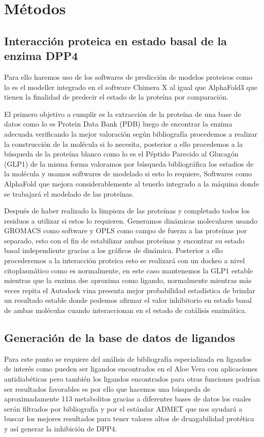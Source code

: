 \section{Métodos}

\subsection{Interacción proteica en estado basal de la enzima DPP4}
Para ello haremos uso de los softwares de predicción de modelos proteicos como lo es el modeller integrado en el software Chimera X al igual que AlphaFold3 que tienen la finalidad de predecir el estado de la proteína por comparación.

El primero objetivo a cumplir es la extracción de la proteína de una base de datos como lo es Protein Data Bank (PDB) luego de encontrar la enzima adecuada verificando la mejor valoración según bibliografía procedemos a realizar la construcción de la molécula si lo necesita, posterior a ello procedemos a la búsqueda de la proteína blanco como lo es el Péptido Parecido al Glucagón (GLP1) de la misma forma valoramos por búsqueda bibliográfica los estadios de la molécula y usamos softwares de modelado si esto lo requiere, Softwares como AlphaFold que mejora considerablemente al tenerlo integrado a la máquina donde se trabajará el modelado de las proteínas.

Después de haber realizado la limpieza de las proteínas y completado todos los residuos a utilizar si estos lo requieren. Generamos dinámicas moleculares usando GROMACS como software y OPLS como campo de fuerza a las proteínas por separado, esto con el fin de estabilizar ambas proteínas y encontrar su estado basal independiente gracias a los gráficos de dinámica.
Posterior a ello procederemos a la interacción proteica esto se realizará con un dockeo a nivel citoplasmático como es normalmente, en este caso mantenemos la GLP1 estable mientras que la enzima dse aproxima como ligando, normalmente mientras más veces repita el Autodock vina presenta mejor probabilidad estadística de brindar un resultado estable donde podemos afirmar el valor inhibitorio en estado basal de ambas moléculas cuando interaccionan en el estado de catálisis enzimática.

\subsection{Generación de la base de datos de ligandos}
Para este punto se requiere del análisis de bibliografía especializada en ligandos de interés como pueden ser ligandos encontrados en el Aloe Vera con aplicaciones antidiabéticas pero también los ligandos encontrados para otras funciones podrían ser resultados favorables es por ello que hacemos una búsqueda de aproximadamente 113 metabolitos gracias a diferentes bases de datos los cuales serán filtrados por bibliografía y por el estándar ADMET que nos ayudará a buscar los mejores resultados para tener valores altos de druagabilidad protética y así generar la inhibición de DPP4.

